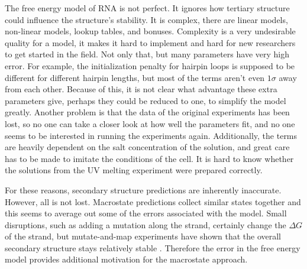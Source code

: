 The free energy model of RNA is not perfect. It ignores how tertiary
structure could influence the structure's stability. It is complex,
there are linear models, non-linear models, lookup tables, and
bonuses. Complexity is a very undesirable quality for a model, it
makes it hard to implement and hard for new researchers to get started
in the field.  Not only that, but many parameters have very high
error. For example, the initialization penalty for hairpin loops is
supposed to be different for different hairpin lengths, but most of
the terms aren't even $1\sigma$ away from each other. Because of this,
it is not clear what advantage these extra parameters give, perhaps
they could be reduced to one, to simplify the model greatly. Another
problem is that the data of the original experiments has been lost, so
no one can take a closer look at how well the parameters fit, and no
one seems to be interested in running the experiments
again. Additionally, the terms are heavily dependent on the salt
concentration of the solution, and great care has to be made to
imitate the conditions of the cell. It is hard to know whether the
solutions from the UV melting experiment were prepared correctly.

For these reasons, secondary structure predictions are inherently
inaccurate. However, all is not lost. Macrostate predictions collect
similar states together and this seems to average out some of the
errors associated with the model. Small disruptions, such as adding a
mutation along the strand, certainly change the $\Delta G$ of the
strand, but mutate-and-map experiments have shown that the overall
secondary structure stays relatively stable
\cite{kladwang2011two}. Therefore the error in the free energy model
provides additional motivation for the macrostate approach. 


